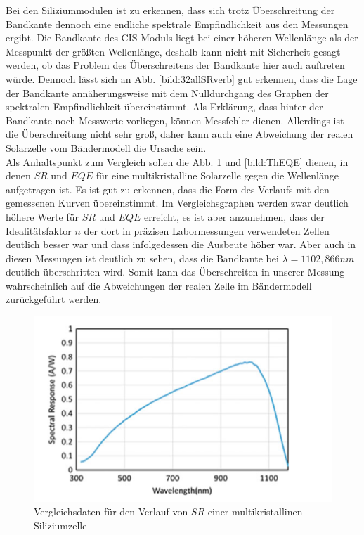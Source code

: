 \clearpage

Bei den Siliziummodulen ist zu erkennen, dass sich trotz 
Überschreitung der Bandkante dennoch eine endliche spektrale Empfindlichkeit aus den Messungen ergibt. 
Die Bandkante des CIS-Moduls liegt bei einer höheren Wellenlänge als der Messpunkt der größten Wellenlänge, deshalb kann nicht mit 
Sicherheit gesagt werden, ob das Problem des Überschreitens der Bandkante hier auch auftreten würde. Dennoch lässt sich an Abb. 
\ref{bild:32allSRverb} gut erkennen, dass die Lage der Bandkante annäherungsweise mit dem Nulldurchgang des Graphen der spektralen Empfindlichkeit
übereinstimmt. Als Erklärung, dass hinter der Bandkante noch Messwerte vorliegen, können Messfehler dienen. Allerdings ist die 
Überschreitung nicht sehr groß, daher kann auch eine Abweichung der realen Solarzelle vom Bändermodell die Ursache sein. \\


Als Anhaltspunkt zum Vergleich sollen die Abb. \ref{bild:ThSR} und \ref{bild:ThEQE} dienen, in denen $SR$ und $EQE$ für eine multikristalline Solarzelle 
gegen die Wellenlänge aufgetragen ist. Es ist gut zu erkennen, dass die Form des Verlaufs mit den gemessenen Kurven übereinstimmt. Im 
Vergleichsgraphen werden zwar deutlich höhere Werte für $SR$ und $EQE$ erreicht, es ist aber anzunehmen, dass der Idealitätsfaktor $n$ 
der dort in präzisen Labormessungen verwendeten Zellen deutlich besser war und dass infolgedessen die Ausbeute höher war.
Aber auch in diesen Messungen ist deutlich zu sehen, dass die Bandkante bei $\lambda = 1102,866 nm$ deutlich überschritten wird. Somit
kann das Überschreiten in unserer Messung wahrscheinlich auf die Abweichungen der realen Zelle im Bändermodell zurückgeführt werden.

\begin{figure}[ht]
    \centering
    \includegraphics[scale=0.75]{Bilder/TheorieSR.png}
    \caption{Vergleichsdaten für den Verlauf von $SR$ einer multikristallinen Siliziumzelle \protect \footnotemark}
    \label{bild:ThSR}
\end{figure}


